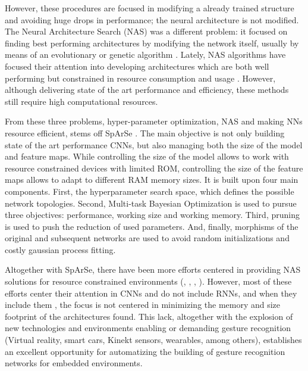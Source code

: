 \documentclass[a4paper, twocolumn]{article}
\begin{document}
However, these procedures are focused in modifying a already trained structure and avoiding huge drops in performance; the neural architecture is not modified. The Neural Architecture Search (NAS) was a different problem: it focused on finding best performing architectures by modifying the network itself, usually by means of an evolutionary or genetic algorithm \cite{K.O.2002}. Lately, NAS algorithms have focused their attention into developing architectures which are both well performing but constrained in resource consumption and usage \cite{Elsken2018}. However, although delivering state of the art performance and efficiency, these methods still require high computational resources.

From these three problems, hyper-parameter optimization, NAS and making NNs resource efficient, stems off SpArSe \cite{Fedorov2019}. The main objective is not only building state of the art performance CNNs, but also managing both the size of the model and feature maps. While controlling the size of the model allows to work with resource constrained devices with limited ROM, controlling the size of the feature maps allows to adapt to different RAM memory sizes. It is built upon four main components. First, the hyperparameter search space, which defines the possible network topologies. Second, Multi-task Bayesian Optimization is used to pursue three objectives: performance, working size and working memory. Third, pruning is used to push the reduction of used parameters. And, finally, morphisms of the original and subsequent networks are used to avoid random initializations and costly gaussian process fitting.

Altogether with SpArSe, there have been more efforts centered in providing NAS solutions for resource constrained environments (\cite{Loni2020}, \cite{Cai2019f}, \cite{Li2018n}, \cite{Lu2019}). However, most of these efforts center their attention in CNNs and do not include RNNs, and when they include them \cite{Pham2018}, the focus is not centered in minimizing the memory and size footprint of the architectures found. This lack, altogether with the explosion of new technologies and environments enabling or demanding gesture recognition (Virtual reality, smart cars, Kinekt sensors, wearables, among others), establishes an excellent opportunity for automatizing the building of gesture recognition networks for embedded environments.
\end{document}
